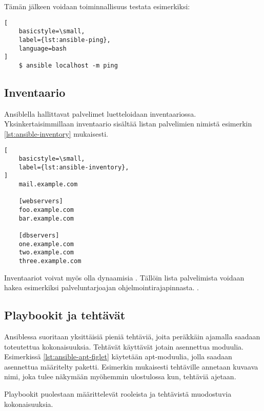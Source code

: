 Tämän jälkeen voidaan toiminnallisuus testata esimerkiksi:

\begin{lstlisting}[
    basicstyle=\small,
    label={lst:ansible-ping},
    language=bash
]
    $ ansible localhost -m ping
\end{lstlisting}

\subsection{Inventaario}

Ansiblella hallittavat palvelimet luetteloidaan inventaariossa.
Yksinkertaisimmillaan inventaario sisältää listan palvelimien nimistä
esimerkin \ref{lst:ansible-inventory} mukaisesti.
\parencite{JamesFreeman2020PA2}

\begin{lstlisting}[
    basicstyle=\small,
    label={lst:ansible-inventory},
]
    mail.example.com

    [webservers]
    foo.example.com
    bar.example.com

    [dbservers]
    one.example.com
    two.example.com
    three.example.com
\end{lstlisting}

Inventaariot voivat myös olla dynaamisia \parencite{JamesFreeman2020PA2}.
Tällöin lista palvelimista voidaan hakea esimerkiksi palveluntarjoajan
ohjelmointirajapinnasta. \parencite{AnsibleDocs}.

\subsection{Playbookit ja tehtävät}

Ansiblessa suoritaan yksittäisiä pieniä tehtäviä, joita peräkkäin ajamalla
saadaan toteutettua kokonaisuuksia. Tehtävät käyttävät jotain asennettua
moduulia. \parencite{JamesFreeman2020PA2} Esimerkissä \ref{lst:ansible-apt-figlet}
käytetään apt-moduulia, jolla saadaan asennettua määritelty paketti. Esimerkin
mukaisesti tehtäville annetaan kuvaava nimi, joka tulee näkymään myöhemmin
ulostulossa kun, tehtäviä ajetaan.



Playbookit puolestaan määrittelevät rooleista ja tehtävistä muodostuvia
kokonaisuuksia. \parencite{JamesFreeman2020PA2}


